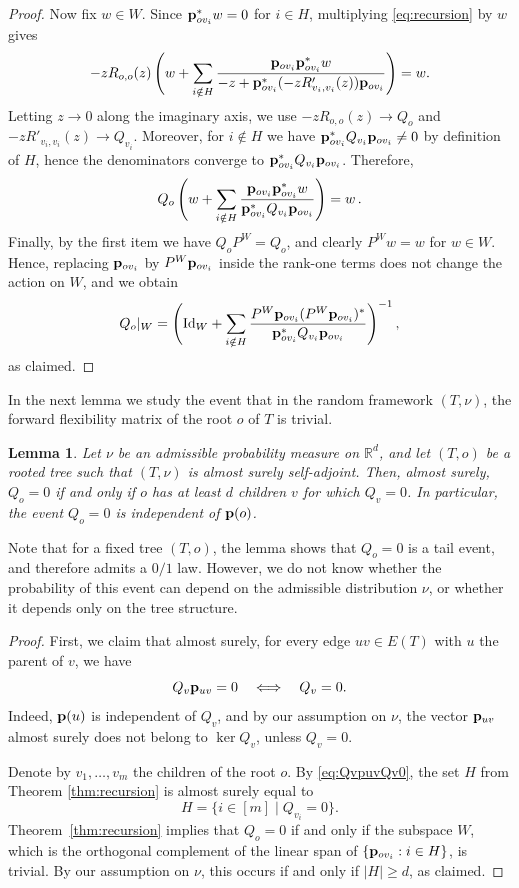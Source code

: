 \documentclass[reqno,english]{amsart}
\numberwithin{equation}{section}
\newtheorem{lemma}[theorem]{Lemma}
\theoremstyle{definition}{
\newtheorem{example}[theorem]{Example}
\newtheorem{definition}[theorem]{Definition}
\newtheorem*{definition*}{Definition}
\newtheorem{problem}[theorem]{Problem}
\newtheorem{question}[theorem]{Question}
}
\newcommand{\R}{\mathbb R}
\newcommand{\p}{{\bf p}}
\newcommand{\Id}{\mathrm{Id}}
\begin{document}
\begin{proof}
Now fix $w\in W$. Since $\p_{ov_i}^*w=0$ for $i\in H$, multiplying \eqref{eq:recursion} by $w$ gives
\[
-zR_{o,o}(z)\left(
w+\sum_{i\notin H}\frac{\p_{ov_i}\p_{ov_i}^*w}{-z+\p_{ov_i}^*(-zR'_{v_i,v_i}(z))\p_{ov_i}}
\right)=w.
\]
Letting $z\to 0$ along the imaginary axis, we use $-zR_{o,o}(z)\to Q_o$ and $-zR'_{v_i,v_i}(z)\to Q_{v_i}$.
Moreover, for $i\notin H$ we have $\p_{ov_i}^*Q_{v_i}\p_{ov_i}\neq 0$ by definition of $H$, hence the denominators converge to
$\p_{ov_i}^*Q_{v_i}\p_{ov_i}$. Therefore,
\[
Q_o\left(
w+\sum_{i\notin H}\frac{\p_{ov_i}\p_{ov_i}^*w}{\p_{ov_i}^*Q_{v_i}\p_{ov_i}}
\right)=w\,.
\]
Finally, by the first item we have $Q_oP^W=Q_o$, and clearly $P^Ww=w$ for $w\in W$. Hence, replacing $\p_{ov_i}$ by $P^W\p_{ov_i}$ inside the
rank-one terms does not change the action on $W$, and we obtain
\[
Q_o|_W=
\left(
\Id_W+\sum_{i\notin H}\frac{P^W\p_{ov_i}(P^W\p_{ov_i})^*}{\p_{ov_i}^*Q_{v_i}\p_{ov_i}}
\right)^{-1},
\]
as claimed.
\end{proof}

In the next lemma we study the event that in the random framework $(T,\nu)$, the forward flexibility matrix of the root $o$ of $T$ is trivial.

\begin{lemma}\label{lem:Qo0}
    Let $\nu$ be an admissible probability measure on $\R^d$, and let $(T,o)$ be a rooted tree such that $(T,\nu)$ is almost surely self-adjoint. 
    Then, almost surely, $Q_o=0$ if and only if $o$ has at least $d$ children $v$ for which $Q_v=0$. 
    In particular, the event $Q_o=0$ is independent of $\p(o)$.
\end{lemma}
Note that for a fixed tree \((T,o)\), the lemma shows that \(Q_o=0\) is a tail event, and therefore admits a \(0/1\) law.
However, we do not know whether the probability of this event can depend on the admissible distribution \(\nu\), or whether it depends only on the tree structure.

\begin{proof}
First, we claim that almost surely, for every edge $uv\in E(T)$ with $u$ the parent of $v$, we have
\begin{equation}\label{eq:QvpuvQv0}
Q_v\p_{uv}=0 \quad\Longleftrightarrow\quad Q_v=0.    
\end{equation}
Indeed, $\p(u)$ is independent of $Q_v$, and by our assumption on $\nu$, the vector $\p_{uv}$ almost surely does not belong to $\ker Q_v$, unless $Q_v=0$.

Denote by $v_1,\ldots,v_m$ the children of the root $o$. By \eqref{eq:QvpuvQv0}, the set $H$ from Theorem \ref{thm:recursion} is almost surely equal to
\begin{equation}\label{eq:H}
H=\{i\in[m]\mid Q_{v_i}=0\}.
\end{equation}
Theorem~\ref{thm:recursion} implies that $Q_o=0$ if and only if the subspace $W$, which is the orthogonal complement of the linear span of $\{\p_{ov_i}: i\in H\}$, is trivial.
By our assumption on $\nu$, this occurs if and only if $|H|\ge d$, as claimed.
\end{proof}
\end{document}
